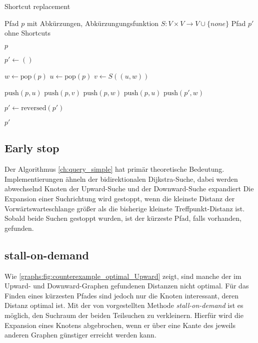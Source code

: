 \begin{algorithm}[ht]
  \caption{Shortcut replacement}
  \begin{algorithmic}[1]
    \Require Pfad $p$ mit Abkürzungen, Abkürzungungsfunktion $S \colon V \times V \to V \cup \{ {none} \}$
    \Ensure Pfad $p'$ ohne Shortcuts

    \State \Return $p$
    \EndIf
    \State

    \State $p' \leftarrow ()$
    \State

    \State $w \leftarrow \text{pop}(p)$
    \State $u \leftarrow \text{pop}(p)$
    \State $v \leftarrow S((u, w))$
    \State

    \State $\text{push}(p, u)$
    \State $\text{push}(p, v)$
    \State $\text{push}(p, w)$
    \Else
    \State $\text{push}(p, u)$
    \State $\text{push}(p', w)$
    \EndIf
    \EndWhile

    \State
    \State $p' \leftarrow \text{reversed}(p')$

    \State
    \State \Return $p'$
  \end{algorithmic}
  \label{ch:alg:shortcut_replacement}
\end{algorithm}

\subsection{Early stop}

Der Algorithmus \ref{ch:query_simple} hat primär theoretische Bedeutung.
Implementierungen ähneln der bidirektionalen Dijkstra-Suche, dabei werden abwechselnd Knoten der Upward-Suche und der Downward-Suche expandiert
Die Expansion einer Suchrichtung wird gestoppt, wenn die kleinste Distanz der Vorwärtswarteschlange größer als die bisherige kleinste Treffpunkt-Distanz ist.
Sobald beide Suchen gestoppt wurden, ist der kürzeste Pfad, falls vorhanden, gefunden.

\subsection{stall-on-demand}

Wie \autoref{graphs:fig:counterexample_optimal_Upward} zeigt, sind manche der im Upward- und Downward-Graphen gefundenen Distanzen nicht optimal.
Für das Finden eines kürzesten Pfades sind jedoch nur die Knoten interessant, deren Distanz optimal ist.
Mit der von \cite{schultes2007dynamic} vorgestellten Methode \emph{stall-on-demand} ist es möglich, den Suchraum der beiden Teilsuchen zu verkleinern.
Hierfür wird die Expansion eines Knotens abgebrochen, wenn er über eine Kante des jeweils anderen Graphen günstiger erreicht werden kann.

